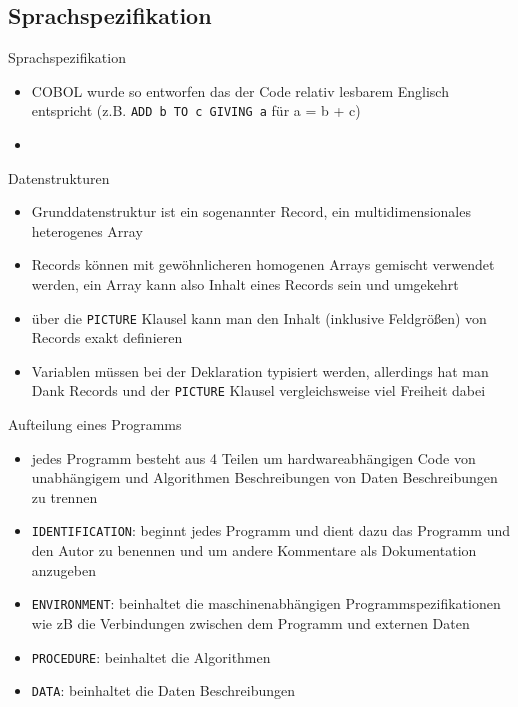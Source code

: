\documentclass[handout]{beamer}
\begin{document}
\subsection{Sprachspezifikation}

\begin{frame}{Sprachspezifikation}
	\begin{itemize}
		\item
			COBOL wurde so entworfen das der Code relativ lesbarem Englisch entspricht (z.B. \texttt{ADD b TO c GIVING a} f\"ur a = b + c)
		\item
			
	\end{itemize}
\end{frame}

\begin{frame}{Datenstrukturen}
	\begin{itemize}
		\item
			Grunddatenstruktur ist ein sogenannter Record, ein multidimensionales heterogenes Array
		\item
			Records k\"onnen mit gew\"ohnlicheren homogenen Arrays gemischt verwendet werden, ein Array kann also Inhalt eines Records sein und umgekehrt
		\item
			über die \texttt{PICTURE} Klausel kann man den Inhalt (inklusive Feldgrößen) von Records exakt definieren
		\item
			Variablen müssen bei der Deklaration typisiert werden, allerdings hat man Dank Records und der \texttt{PICTURE} Klausel vergleichsweise viel Freiheit dabei
	\end{itemize}
\end{frame}

\begin{frame}{Aufteilung eines Programms}
	\begin{itemize}
		\item
			jedes Programm besteht aus 4 Teilen um hardwareabh\"angigen Code von unabh\"angigem und Algorithmen Beschreibungen von Daten Beschreibungen zu trennen
		\item
			\texttt{IDENTIFICATION}: beginnt jedes Programm und dient dazu das Programm und den Autor zu benennen und um andere Kommentare als Dokumentation anzugeben
		\item
			\texttt{ENVIRONMENT}: beinhaltet die maschinenabhängigen Programmspezifikationen wie zB die Verbindungen zwischen dem Programm und externen Daten
		\item
			\texttt{PROCEDURE}: beinhaltet die Algorithmen
		\item
			\texttt{DATA}: beinhaltet die Daten Beschreibungen
	\end{itemize}
\end{frame}
\end{document}
